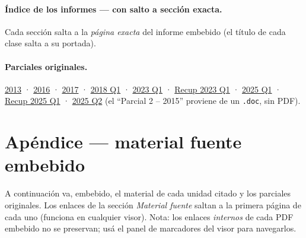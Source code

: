 \documentclass[11pt,a4paper]{article}
\begin{document}
\paragraph{Índice de los informes — con salto a sección exacta.}
Cada sección salta a la \emph{página exacta} del informe embebido (el título de cada clase salta
a su portada).



\paragraph{Parciales originales.}
\hyperref[src:p2013]{2013} ·
\hyperref[src:p2016]{2016} ·
\hyperref[src:p2017]{2017} ·
\hyperref[src:p2018]{2018 Q1} ·
\hyperref[src:p2023]{2023 Q1} ·
\hyperref[src:r2023]{Recup 2023 Q1} ·
\hyperref[src:p2025q1]{2025 Q1} ·
\hyperref[src:r2025q1]{Recup 2025 Q1} ·
\hyperref[src:p2025q2]{2025 Q2}
(el ``Parcial 2 -- 2015'' proviene de un \texttt{.doc}, sin PDF).

\newpage


\clearpage

\clearpage

\clearpage

\clearpage

\clearpage

\clearpage

\clearpage

\clearpage

\clearpage


\clearpage
{}
{}
\section*{Apéndice — material fuente embebido}
A continuación va, embebido, el material de cada unidad citado y los parciales originales. Los
enlaces de la sección \emph{Material fuente} saltan a la primera página de cada uno (funciona en
cualquier visor). Nota: los enlaces \emph{internos} de cada PDF embebido no se preservan; usá el
panel de marcadores del visor para navegarlos.
\end{document}
